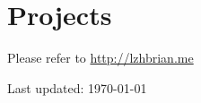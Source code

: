 \documentclass[11pt, a4paper]{article} %
\begin{document}
\section*{Projects}
Please refer to \href{http://lzhbrian.me}{http://lzhbrian.me}








\vfill{} %


\begin{center}
{\scriptsize Last updated: \today}
\end{center}

\end{document}
